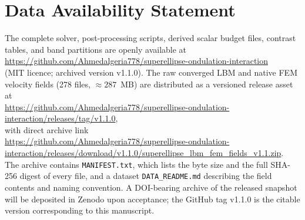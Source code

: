\documentclass[aip,pof,reprint]{revtex4-2}
\begin{document}
\section*{Data Availability Statement}
\begin{sloppypar}
\noindent The complete solver, post-processing scripts, derived scalar budget files, contrast tables, and band partitions are openly available at\\[2pt]
{\small\url{https://github.com/Ahmedalgeria778/superellipse-ondulation-interaction}}\\[2pt]
(MIT licence; archived version v1.1.0). The raw converged LBM and native FEM velocity fields (278 files, $\approx287$~MB) are distributed as a versioned release asset at\\[2pt]
{\small\url{https://github.com/Ahmedalgeria778/superellipse-ondulation-interaction/releases/tag/v1.1.0},}\\[2pt]
with direct archive link\\[2pt]
{\small\url{https://github.com/Ahmedalgeria778/superellipse-ondulation-interaction/releases/download/v1.1.0/superellipse_lbm_fem_fields_v1.1.zip}}.\\[2pt]
The archive contains \texttt{MANIFEST.txt}, which lists the byte size and the full SHA-256 digest of every file, and a dataset \texttt{DATA\_README.md} describing the field contents and naming convention. A DOI-bearing archive of the released snapshot will be deposited in Zenodo upon acceptance; the GitHub tag v1.1.0 is the citable version corresponding to this manuscript.
\end{sloppypar}


\end{document}
